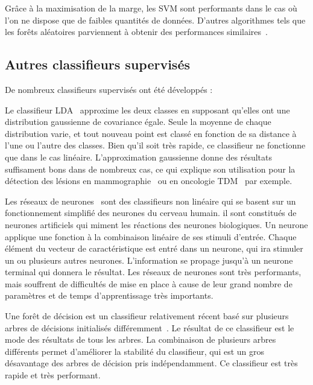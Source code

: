 Grâce à la maximisation de la marge, les SVM sont performants dans le cas où l'on ne dispose que de faibles quantités de données. D'autres algorithmes tels que les forêts aléatoires parviennent à obtenir des performances similaires~\cite{statnikov2008comprehensive}.

\subsection{Autres classifieurs supervisés}

De nombreux classifieurs supervisés ont été développés :

\label{lab:LDA}
Le classifieur LDA~\cite{fisher1936use} approxime les deux classes en supposant qu'elles ont une distribution gaussienne de covariance égale. Seule la moyenne de chaque distribution varie, et tout nouveau point est classé en fonction de sa distance à l'une ou l'autre des classes. Bien qu'il soit très rapide, ce classifieur ne fonctionne que dans le cas linéaire. L'approximation gaussienne donne des résultats suffisament bons dans de nombreux cas, ce qui explique son utilisation pour la détection des lésions en mammographie~\cite{baydush2007incorporation} ou en oncologie TDM~\cite{gurcan2002lung} par exemple.


Les réseaux de neurones~\cite{haykin1999neural} sont des classifieurs non linéaire qui se basent sur un fonctionnement simplifié des neurones du cerveau humain. il sont constitués de neurones artificiels qui miment les réactions des neurones biologiques. Un neurone applique une fonction à la combinaison linéaire de ses stimuli d'entrée. Chaque élément du vecteur de caractéristique est entré dans un neurone, qui ira stimuler un ou plusieurs autres neurones. L'information se propage jusqu'à un neurone terminal qui donnera le résultat. Les réseaux de neurones sont très performants, mais souffrent de difficultés de mise en place à cause de leur grand nombre de paramètres et de temps d'apprentissage très importants.

Une forêt de décision est un classifieur relativement récent basé sur plusieurs arbres de décisions initialisés différemment~\cite{ho1998random}. Le résultat de ce classifieur est le mode des résultats de tous les arbres. La combinaison de plusieurs arbres différents permet d'améliorer la stabilité du classifieur, qui est un gros désavantage des arbres de décision pris indépendamment. Ce classifieur est très rapide et très performant.
